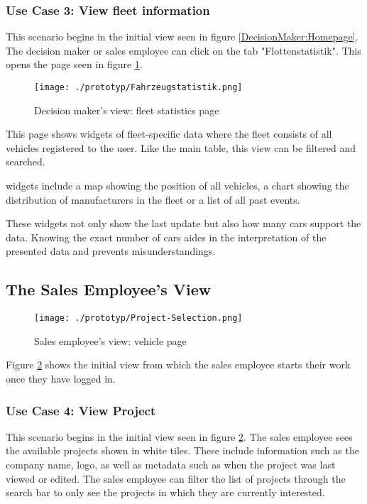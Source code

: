 \subsubsection{Use Case 3: View fleet information}
This scenario begins in the initial view seen in figure \ref{DecisionMaker:Homepage}. The decision maker or sales employee can click on the tab "Flottenstatistik". This opens the page seen in figure \ref{DecisionMaker:Fahrzeugstatistik}.
\begin{figure}[H]
  \centering
  \texttt{[image: ./prototyp/Fahrzeugstatistik.png]}
  \caption{Decision maker's view: fleet statistics page}
  \label{DecisionMaker:Fahrzeugstatistik}
\end{figure}
This page shows \glspl{widget} of fleet-specific data where the fleet consists of all vehicles registered to the user. Like the main table, this view can be filtered and searched.

\Glspl{widget} include a map showing the position of all vehicles, a chart showing the distribution of manufacturers in the fleet or a list of all past events.

These \glspl{widget} not only show the last update but also how many cars support the \gls{data}. Knowing the exact number of cars aides in the interpretation of the presented data and prevents misunderstandings.

\newpage

\subsection{The Sales Employee's View}
\begin{figure}[ht]
  \centering
  \texttt{[image: ./prototyp/Project-Selection.png]}
  \caption{Sales employee's view: vehicle page}
  \label{Configurator:ProjectSelection}
\end{figure}
Figure \ref{Configurator:ProjectSelection} shows the initial view from which the sales employee starts their work once they have logged in.


\subsubsection{Use Case 4: View Project}
This scenario begins in the initial view seen in figure \ref{Configurator:ProjectSelection}. The sales employee sees the available projects shown in white tiles. These include information such as the company name, logo, as well as metadata such as when the project was last viewed or edited. The sales employee can filter the list of projects through the search bar to only see the projects in which they are currently interested.


